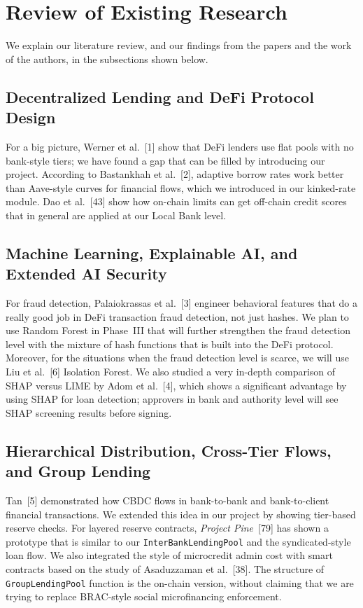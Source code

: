 \documentclass[12pt, a4paper]{report}
\begin{document}
\section{Review of Existing Research}
\label{sec:review-existing}

We explain our literature review, and our findings from the papers and the work of the authors, in the subsections shown below.

\subsection{Decentralized Lending and DeFi Protocol Design}

For a big picture, Werner et al.~[1] show that DeFi lenders use flat pools with no bank-style tiers; we have found a gap that can be filled by introducing our project. According to Bastankhah et al.~[2], adaptive borrow rates work better than Aave-style curves for financial flows, which we introduced in our kinked-rate module. Dao et al.~[43] show how on-chain limits can get off-chain credit scores that in general are applied at our Local Bank level.

\subsection{Machine Learning, Explainable AI, and Extended AI Security}

For fraud detection, Palaiokrassas et al.~[3] engineer behavioral features that do a really good job in DeFi transaction fraud detection, not just hashes. We plan to use Random Forest in Phase~III that will further strengthen the fraud detection level with the mixture of hash functions that is built into the DeFi protocol. Moreover, for the situations when the fraud detection level is scarce, we will use Liu et al.~[6] Isolation Forest. We also studied a very in-depth comparison of SHAP versus LIME by Adom et al.~[4], which shows a significant advantage by using SHAP for loan detection; approvers in bank and authority level will see SHAP screening results before signing.

\subsection{Hierarchical Distribution, Cross-Tier Flows, and Group Lending}
\label{sec:lit-cross-tier}

Tan~[5] demonstrated how CBDC flows in bank-to-bank and bank-to-client financial transactions. We extended this idea in our project by showing tier-based reserve checks. For layered reserve contracts, \textit{Project Pine}~[79] has shown a prototype that is similar to our \texttt{InterBankLendingPool} and the syndicated-style loan flow. We also integrated the style of microcredit admin cost with smart contracts based on the study of Asaduzzaman et al.~[38]. The structure of \texttt{GroupLendingPool} function is the on-chain version, without claiming that we are trying to replace BRAC-style social microfinancing enforcement.
\end{document}
